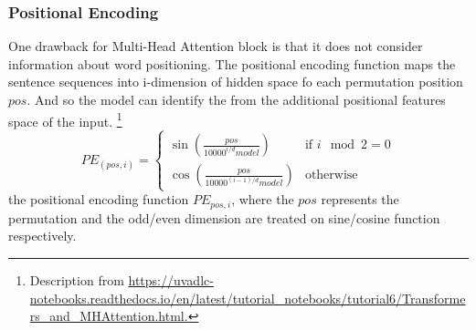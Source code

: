 %
%
\subsubsection{Positional Encoding}
One drawback for Multi-Head Attention block is that it does not consider information about word positioning. The positional encoding function maps the sentence sequences into i-dimension of hidden space fo each permutation position $ pos $. And so the model can identify the from the additional positional features space of the input.
\footnote{Description from \url{https://uvadlc-notebooks.readthedocs.io/en/latest/tutorial_notebooks/tutorial6/Transformers_and_MHAttention.html.}}
\[ PE_{(pos,i)} = \begin{cases} 
\sin\left(\frac{pos}{10000^{i/d}model}\right) & \text{if }i \mod 2 = 0 \\
\cos\left(\frac{pos}{10000^{(i-1)/d}model}\right) & \text{otherwise}
       \end{cases}
    \]
the positional encoding function $ PE_{pos,i} $, where the $ pos $ represents the permutation 
and the odd/even dimension are treated on sine/cosine function respectively. 
